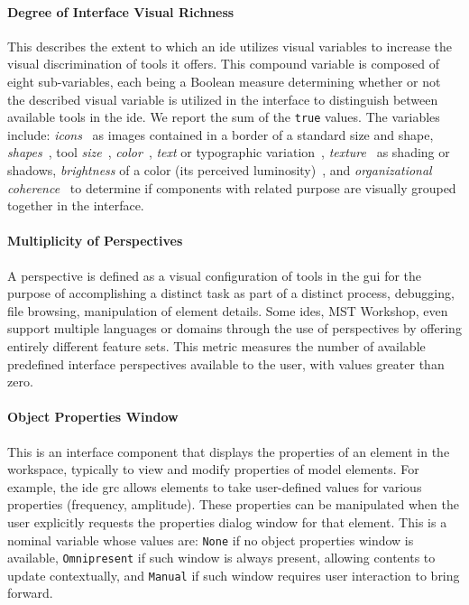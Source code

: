 \paragraph{Degree of Interface Visual Richness}
This describes the extent to which an \ac{ide} utilizes visual variables to increase the visual discrimination of tools it offers.
This compound variable is composed of eight sub-variables, each being a Boolean measure determining whether or not the described visual variable is utilized in the interface to distinguish between available tools in the \ac{ide}.
We report the sum of the \texttt{true} values.
The variables include:
\emph{icons}~\cite{costagliola2002,moody2009} as images contained in a border of a standard size and shape,
\emph{shapes}~\cite{moody2009},
tool \emph{size}~\cite{moody2009},
\emph{color}~\cite{moody2009},
\emph{text} or typographic variation~\cite{moody2009},
\emph{texture}~\cite{moody2009} as shading or shadows,
\emph{brightness} of a color (\ie its perceived luminosity)~\cite{moody2009},
and
\emph{organizational coherence}~\cite{constantine1996} to determine if components with related purpose are visually grouped together in the interface.


\paragraph{Multiplicity of Perspectives}
A perspective is defined as a visual configuration of tools in the \ac{gui}
for the purpose of accomplishing a distinct task as part of a distinct
process, \eg debugging, file browsing, manipulation of element details.
Some \acp{ide}, \eg MST Workshop, even support multiple languages or
domains through the use of perspectives by offering entirely different
feature sets. This metric measures the number of available predefined
interface perspectives available to the user, with values greater than
zero.


\paragraph{Object Properties Window}
This is an interface component that displays the properties of an element
in the workspace, typically to view and modify properties of model
elements.  For example, the \ac{ide} \ac{grc} allows elements to take
user-defined values for various properties (\eg frequency, amplitude).
These properties can be manipulated when the user explicitly requests the
properties dialog window for that element.
This is a nominal variable whose values are:
\texttt{None} if no object properties window is available,
\texttt{Omnipresent} if such window is always present, allowing contents to update contextually,
and \texttt{Manual} if such window requires user interaction to bring forward.


